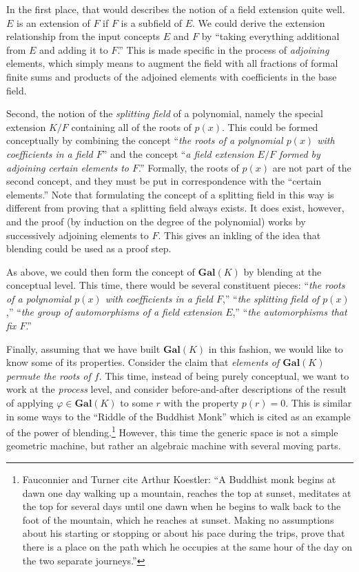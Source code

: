 In the first place, that would describes the notion of a field
extension quite well.  $E$ is an extension of $F$ if $F$ is a subfield of $E$.
We could derive the extension relationship from the input concepts $E$
and $F$ by ``taking everything additional from $E$ and adding it to
$F$.''  This is made specific in the process of \emph{adjoining}
elements,
which simply means to augment 
the field 
with all
fractions of
formal finite sums and products of the adjoined elements with
coefficients in the base field.

Second, the notion of the \emph{splitting field} of a polynomial,
namely the special extension $K/F$ containing all of the roots of
$p(x)$.  This could be formed conceptually by combining the concept
``\emph{the roots of a polynomial $p(x)$ with coefficients in a field
  $F$}'' and the concept ``\emph{a field extension $E/F$ formed by
  adjoining certain elements to $F$}.''  Formally, the roots of $p(x)$
are not part of the second concept, and they must be put in
correspondence with the ``certain elements.''  Note that formulating
the concept of a splitting field in this way is different from proving
that a splitting field always exists.  It does exist, however, and the proof
(by induction on the degree of the polynomial) works by successively
adjoining elements to $F$.  This gives an inkling of the idea that
blending could be used as a proof step.

As above, we could then form the concept of $\mathbf{Gal}(K)$ by blending
at the conceptual level.  This time, there would be several constituent pieces:
``\emph{the roots of a polynomial $p(x)$ with coefficients in a field $F$},''
``\emph{the splitting field of $p(x)$},''
``\emph{the group of automorphisms of a field extension $E$},''
``\emph{the automorphisms that fix $F$}.''

Finally, assuming that we have built $\mathbf{Gal}(K)$ in this
fashion, we would like to know some of its properties.  Consider the
claim that \emph{elements of $\mathbf{Gal}(K)$ permute the roots of
  $f$}.  This time, instead of being purely conceptual, we want to
work at the \emph{process} level, and consider before-and-after
descriptions of the result of applying $\varphi\in\mathbf{Gal}(K)$ to
some $r$ with the property $p(r)=0$.  This is similar in some ways to
the ``Riddle of the Buddhist Monk'' \cite{Fau98} which is cited as
an example of the power of blending.\footnote{Fauconnier and Turner
  cite Arthur Koestler: ``A Buddhist monk begins at dawn one day
  walking up a mountain, reaches the top at sunset, meditates at the
  top for several days until one dawn when he begins to walk back to
  the foot of the mountain, which he reaches at sunset.  Making no
  assumptions about his starting or stopping or about his pace during
  the trips, prove that there is a place on the path which he occupies
  at the same hour of the day on the two separate journeys.''}
However, this time the generic space is not a simple geometric machine,
but rather an algebraic machine with several moving parts.

